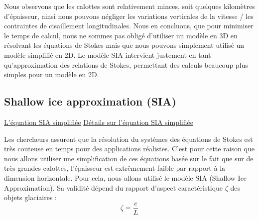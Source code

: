\documentclass{article}
\begin{document}
Nous observons que les calottes sont relativement minces, soit quelques kilomètres d'épaisseur, ainsi nous pouvons négliger les variations verticales de la vitesse / les contraintes de cisaillement longitudinales. Nous en concluons, que pour minimiser le temps de calcul, nous ne sommes pas obligé d'utiliser un modèle en 3D en résolvant les équations de Stokes mais que nous pouvons simplement utilisé un modèle simplifié en 2D. Le modèle SIA intervient justement en tant qu’approximation des relations de Stokes, permettant des calculs beaucoup plus simples pour un modèle en 2D.

 
\subsection{Shallow ice approximation (SIA)}
\href{https://tel.archives-ouvertes.fr/tel-00192512v2/document}{L'équation SIA simplifiée}
\newline
\href{https://www.cambridge.org/core/journals/journal-of-glaciology/article/dependence-of-centuryscale-projections-of-the-greenland-ice-sheet-on-its-thermal-regime/71233B1A12B0348B4AB38D9B2EE493AC}{Détails sur l'équation SIA simplifiée}

Les chercheurs assurent que la résolution du systèmes des équations de Stokes est très couteuse en temps pour des applications réalistes. C'est pour cette raison que nous allons utiliser une simplification de ces équations basée sur le fait que sur de très grandes calottes, l'épaisseur est extrêmement faible par rapport à la dimension horizontale. Pour cela, nous allons utilisé le modèle SIA (Shallow Ice Approximation). Sa validité dépend du rapport d'aspect caractéristique $\zeta$ des objets glaciaires :
\begin{equation}
\zeta = \frac{e}{L}
\label{eq2} 
\end{equation}
\end{document}
